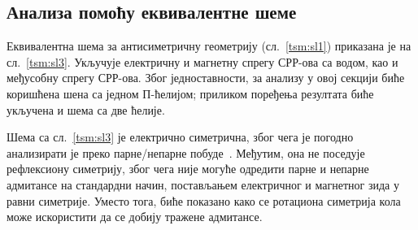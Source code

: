 \subsection{Анализа помоћу еквивалентне шеме}\label{tsm:sec:eqcirc}
Еквивалентна шема за антисиметричну геометрију (сл.~\ref{tsm:sl1}) приказана је на сл.~\ref{tsm:sl3}. Укључује електричну и магнетну спрегу СРР-ова са водом, као и међусобну спрегу СРР-ова. Због једноставности, за анализу у овој секцији биће коришћена шена са једном П-ћелијом; приликом поређења резултата биће укључена и шема са две ћелије.

Шема са сл.~\ref{tsm:sl3} је електрично симетрична, због чега је погодно анализирати је преко парне/непарне побуде~\cite{hong}. Међутим, она не поседује рефлексиону симетрију, због чега није могуће одредити парне и непарне адмитансе на стандардни начин, постављањем електричног и магнетног зида у равни симетрије. Уместо тога, биће показано како се ротациона симетрија кола може искористити да се добију тражене адмитансе.

